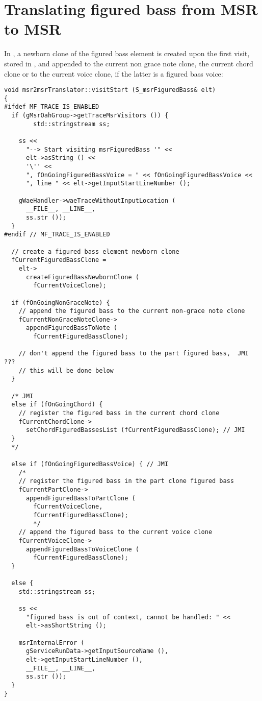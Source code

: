 \section{Translating figured bass from MSR to MSR}

In , a newborn clone of the figured bass element is created upon the first visit, stored in , and appended to the current non grace note clone, the current chord clone or to the current voice clone, if the latter is a figured bass voice: %
\begin{lstlisting}[language=CPlusPlus]
void msr2msrTranslator::visitStart (S_msrFiguredBass& elt)
{
#ifdef MF_TRACE_IS_ENABLED
  if (gMsrOahGroup->getTraceMsrVisitors ()) {
		std::stringstream ss;

    ss <<
      "--> Start visiting msrFiguredBass '" <<
      elt->asString () <<
      '\'' <<
      ", fOnGoingFiguredBassVoice = " << fOnGoingFiguredBassVoice <<
      ", line " << elt->getInputStartLineNumber ();

    gWaeHandler->waeTraceWithoutInputLocation (
      __FILE__, __LINE__,
      ss.str ());
  }
#endif // MF_TRACE_IS_ENABLED

  // create a figured bass element newborn clone
  fCurrentFiguredBassClone =
    elt->
      createFiguredBassNewbornClone (
        fCurrentVoiceClone);

  if (fOnGoingNonGraceNote) {
    // append the figured bass to the current non-grace note clone
    fCurrentNonGraceNoteClone->
      appendFiguredBassToNote (
      	fCurrentFiguredBassClone);

    // don't append the figured bass to the part figured bass,  JMI ???
    // this will be done below
  }

  /* JMI
  else if (fOnGoingChord) {
    // register the figured bass in the current chord clone
    fCurrentChordClone->
      setChordFiguredBassesList (fCurrentFiguredBassClone); // JMI
  }
  */

  else if (fOnGoingFiguredBassVoice) { // JMI
    /*
    // register the figured bass in the part clone figured bass
    fCurrentPartClone->
      appendFiguredBassToPartClone (
        fCurrentVoiceClone,
        fCurrentFiguredBassClone);
        */
    // append the figured bass to the current voice clone
    fCurrentVoiceClone->
      appendFiguredBassToVoiceClone (
        fCurrentFiguredBassClone);
  }

  else {
    std::stringstream ss;

    ss <<
      "figured bass is out of context, cannot be handled: " <<
      elt->asShortString ();

    msrInternalError (
      gServiceRunData->getInputSourceName (),
      elt->getInputStartLineNumber (),
      __FILE__, __LINE__,
      ss.str ());
  }
}
\end{lstlisting}

